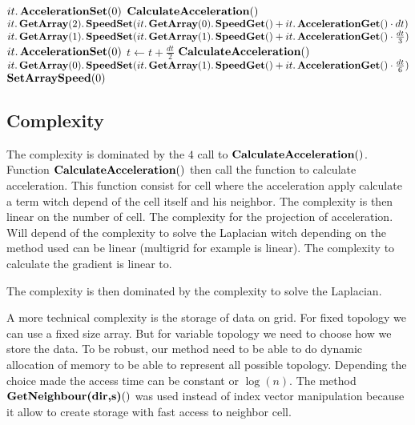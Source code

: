 \begin{algorithm}
\begin{algorithmic}[1]
       \EndFor
            \State $it.\mathop{\textbf{AccelerationSet}}(0)$
        \EndFor
        \State $\mathop{\textbf{CalculateAcceleration}}()$
            \State $it.\mathop{\textbf{GetArray}}(2).\mathop{\textbf{SpeedSet}}(it.\mathop{\textbf{GetArray}}(0).\mathop{\textbf{SpeedGet}}()+it.\mathop{\textbf{AccelerationGet}}()\cdot dt)$
            \State $it.\mathop{\textbf{GetArray}}(1).\mathop{\textbf{SpeedSet}}(it.\mathop{\textbf{GetArray}}(1).\mathop{\textbf{SpeedGet}}()+it.\mathop{\textbf{AccelerationGet}}()\cdot \frac{dt}{3})$
        \EndFor
            \State $it.\mathop{\textbf{AccelerationSet}}(0)$
        \EndFor
        \State $t\gets t+\frac{dt}{2}$
        \State $\mathop{\textbf{CalculateAcceleration}}()$
            \State $it.\mathop{\textbf{GetArray}}(0).\mathop{\textbf{SpeedSet}}(it.\mathop{\textbf{GetArray}}(1).\mathop{\textbf{SpeedGet}}()+it.\mathop{\textbf{AccelerationGet}}()\cdot \frac{dt}{6})$
         \EndFor
        \State $\mathop{\textbf{SetArraySpeed}}(0)$
        \EndProcedure
        \end{algorithmic}
\end{algorithm}

\subsection{Complexity}

The complexity is dominated by the $4$ call to $\mathop{\textbf{CalculateAcceleration}}()$.
Function $\mathop{\textbf{CalculateAcceleration}}()$ then call the function to calculate acceleration.
This function consist for cell where the acceleration apply calculate a term witch depend of the cell itself and his neighbor.
The complexity is then linear on the number of cell.
The complexity for the projection of acceleration. Will depend of the complexity to solve the Laplacian witch depending
on the method used can be linear (multigrid for example is linear). The complexity to calculate the gradient is linear to.

The complexity is then dominated by the complexity to solve the Laplacian.

A more technical complexity is the storage of data on grid. For fixed topology we can use a fixed size array.
But for variable topology we need to choose how we store the data.
To be robust, our method need to be able to do dynamic allocation of memory to be able to represent all possible topology.
Depending the choice made the access time can be constant or $\log(n)$.
The method $\mathop{\textbf{GetNeighbour(dir,s)}}()$ was used instead of index vector manipulation because it allow to create storage
with fast access to neighbor cell.


